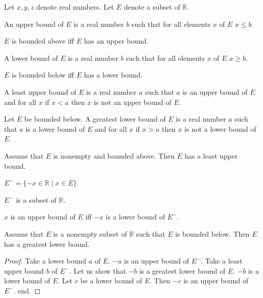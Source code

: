 \documentclass{article}
\begin{document}
\begin{forthel}
Let $x,y,z$ denote real numbers.
Let $E$ denote a subset of $\mathbb{R}$.

\begin{definition}[1 7]
An upper bound of $E$ is a
real number $b$ such that for all elements $x$ of $E$ $x \leq b$.
\end{definition}

\begin{definition}[1 7a]
$E$ is bounded above iff
$E$ has an upper bound.
\end{definition}

\begin{definition}[1 7b]
A lower bound of $E$ is a
real number $b$ such that for all elements $x$ of $E$ $x \geq b$.
\end{definition}

\begin{definition}[1 7c]
$E$ is bounded below iff
$E$ has a lower bound.
\end{definition}

\begin{definition}[1 8]
A least upper bound of $E$ is a real number $a$ such that
$a$ is an upper bound of $E$ and for all $x$ if $x < a$ then $x$
is not an upper bound of $E$.
\end{definition}

\begin{definition}[1 8a]
Let $E$ be bounded below.
A greatest lower bound of $E$ is a real number $a$ such that
$a$ is a lower bound of $E$ and for all $x$ if $x > a$ then $x$ is
not a lower bound of $E$.
\end{definition}

\begin{axiom}[1 19]
Assume that $E$ is nonempty and bounded above.
Then $E$ has a least upper bound.
\end{axiom}

\begin{definition}
$E^- = \{-x \in \mathbb{R} \mid x \in E\}$.
\end{definition}

\begin{lemma}
$E^-$ is a subset of $\mathbb{R}$.
\end{lemma}

\begin{lemma}
$x$ is an upper bound of $E$ iff $-x$ is a lower bound of $E^-$.
\end{lemma}

\begin{theorem}[1 11] Assume that $E$ is a nonempty subset of $\mathbb{R}$
such that $E$ is bounded below.
Then $E$ has a greatest lower bound.\end{theorem}
\begin{proof}
Take a lower bound $a$ of $E$.
$-a$ is an upper bound of $E^-$.
Take a least upper bound $b$ of $E^-$.
Let us show that $-b$ is a greatest lower bound of $E$.
$-b$ is a lower bound of $E$. Let $c$ be a lower bound of $E$.
Then $-c$ is an upper bound of $E^-$.
end.
\end{proof}

\end{forthel}
\end{document}
